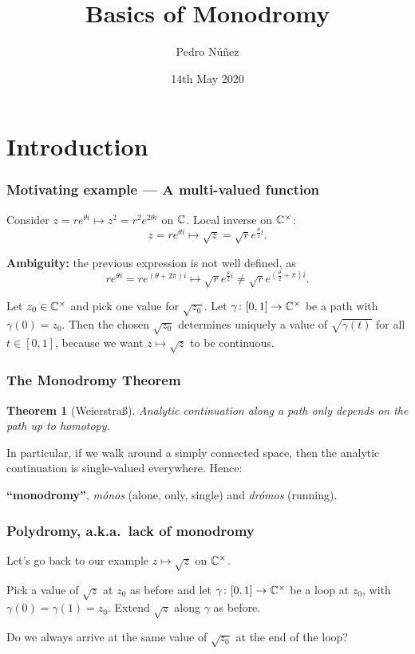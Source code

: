 \documentclass[notheorems, hyperref={backref}]{beamer}
\title[Basics of monodromy]{Basics of Monodromy}
\author{Pedro Núñez}
\institute{Basic Notions --- University of Freiburg}
\date{14th May 2020}
\newtheorem{thm}{Theorem}
\begin{document}
 
\frame{\titlepage}

\section{Introduction}
\begin{frame}
    \frametitle{Motivating example --- A multi-valued function}
    Consider $z=re^{\theta i}\mapsto z^{2}=r^{2}e^{2\theta i}$ on $\mathbb{C}$.
    Local inverse on $\mathbb{C}^{\times}$:
    \[ z=re^{\theta i} \mapsto \sqrt{z}=\sqrt{r}e^{\frac{\theta}{2}i}. \]
    \pause

    \textbf{Ambiguity:} the previous expression is not well defined, as
    \[ re^{\theta i}=re^{(\theta+2\pi)i}\mapsto \sqrt{r}e^{\frac{\theta}{2}i}\neq \sqrt{r}e^{\left(\frac{\theta}{2}+\pi\right)i}. \]
    \pause

    Let $z_{0}\in \mathbb{C}^{\times}$ and pick one value for $\sqrt{z_{0}}$.
    Let $\gamma\colon [0,1]\to \mathbb{C}^{\times}$ be a path with $\gamma(0)=z_{0}$.
    Then the chosen $\sqrt{z_{0}}$ determines uniquely a value of $\sqrt{\gamma(t)}$ for all $t\in [0,1]$, because we want $z\mapsto \sqrt{z}$ to be continuous.
\end{frame}
 
\begin{frame}
    \frametitle{The Monodromy Theorem}
    \begin{thm}[Weierstraß]
	Analytic continuation along a path only depends on the path up to homotopy.
    \end{thm}
    \pause
    \vspace{2em}
    In particular, if we walk around a simply connected space, then the analytic continuation is single-valued everywhere.
    \pause
    \vspace{2em}
    Hence:
    
    \textbf{``monodromy''}, \textit{mónos} (alone, only, single) and \textit{drómos} (running).
\end{frame}

\begin{frame}
    \frametitle{Polydromy, a.k.a.~lack of monodromy}
    Let's go back to our example $z\mapsto \sqrt{z}$ on $\mathbb{C}^{\times}$.
    \pause

    Pick a value of $\sqrt{z}$ at $z_{0}$ as before and let $\gamma\colon [0,1]\to \mathbb{C}^{\times}$ be a loop at $z_{0}$, with $\gamma(0)=\gamma(1)=z_{0}$.
    Extend $\sqrt{z}$ along $\gamma$ as before.
    \vspace{10em}
    \pause

    Do we always arrive at the same value of $\sqrt{z_{0}}$ at the end of the loop?
\end{frame}
\end{document}
